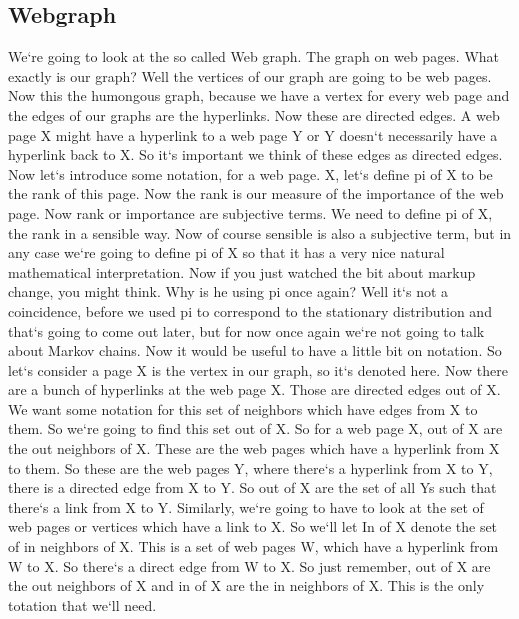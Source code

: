 \subsection{Webgraph}
We`re going to look at the so called Web graph.
The graph on web pages.
What exactly is our graph? Well the vertices of our graph are going to be web pages.
Now this the humongous graph, because we have a vertex for every web page and the edges of our graphs are the hyperlinks.
Now these are directed edges.
A web page X might have a hyperlink to a web page Y or Y doesn`t necessarily have a hyperlink back to X\@.
So it`s important we think of these edges as directed edges.
Now let`s introduce some notation, for a web page.
X, let`s define pi of X to be the rank of this page.
Now the rank is our measure of the importance of the web page.
Now rank or importance are subjective terms.
We need to define pi of X, the rank in a sensible way.
Now of course sensible is also a subjective term, but in any case we`re going to define pi of X so that it has a very nice natural mathematical interpretation.
Now if you just watched the bit about markup change, you might think.
Why is he using pi once again? Well it`s not a coincidence, before we used pi to correspond to the stationary distribution and that`s going to come out later, but for now once again we`re not going to talk about Markov chains.
Now it would be useful to have a little bit on notation.
So let`s consider a page X is the vertex in our graph, so it`s denoted here.
Now there are a bunch of hyperlinks at the web page X\@.
Those are directed edges out of X\@.
We want some notation for this set of neighbors which have edges from X to them.
So we`re going to find this set out of X\@.
So for a web page X, out of X are the out neighbors of X\@.
These are the web pages which have a hyperlink from X to them.
So these are the web pages Y, where there`s a hyperlink from X to Y, there is a directed edge from X to Y\@.
So out of X are the set of all Ys such that there`s a link from X to Y\@.
Similarly, we`re going to have to look at the set of web pages or vertices which have a link to X\@.
So we`ll let In of X denote the set of in neighbors of X\@.
This is a set of web pages W, which have a hyperlink from W to X\@.
So there`s a direct edge from W to X\@.
So just remember, out of X are the out neighbors of X and in of X are the in neighbors of X\@.
This is the only totation that we`ll need.

